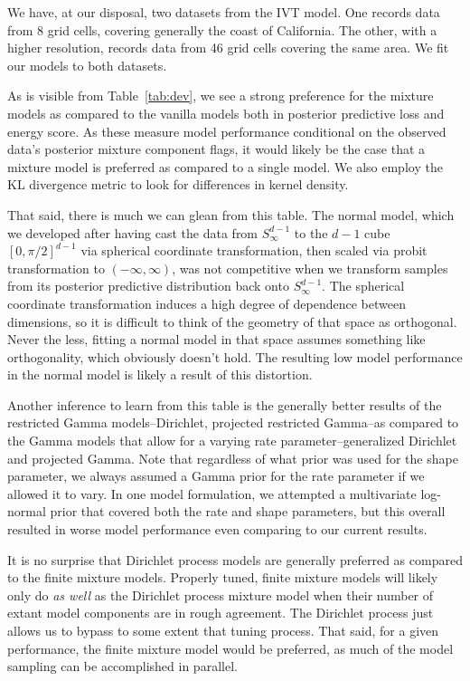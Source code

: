 We have, at our disposal, two datasets from the IVT model.  One records data from 8 grid cells,
  covering generally the coast of California.  The other, with a higher resolution, records data
  from 46 grid cells covering the same area.  We fit our models to both datasets.

\begin{table}[h]
  
\end{table}

As is visible from Table~\ref{tab:dev}, we see a strong preference for the mixture models as
  compared to the vanilla models both in posterior predictive loss and energy score.  As these
  measure model performance conditional on the observed data's posterior mixture component flags,
  it would likely be the case that a mixture model is preferred as compared to a single model.  We
  also employ the KL divergence metric to look for differences in kernel density.

That said, there is much we can glean from this table.  The normal model, which we developed after
  having cast the data from $S_{\infty}^{d-1}$ to the $d-1$ cube $[0,\pi/2]^{d-1}$ via spherical
  coordinate transformation, then scaled via probit transformation to $(-\infty,\infty)$, was not
  competitive when we transform samples from its posterior predictive distribution back onto
  $S_{\infty}^{d-1}$. The spherical coordinate transformation induces a high degree of dependence
  between dimensions, so it is difficult to think of the geometry of that space as orthogonal.
  Never the less, fitting a normal model in that space assumes something like orthogonality, which
  obviously doesn't hold.  The resulting low model performance in the normal model is likely a
  result of this distortion.

Another inference to learn from this table is the generally better results of the restricted Gamma
  models--Dirichlet, projected restricted Gamma--as compared to the Gamma models that allow for a
  varying rate parameter--generalized Dirichlet and projected Gamma.  Note that regardless of what
  prior was used for the shape parameter, we always assumed a Gamma prior for the rate parameter if
  we allowed it to vary.  In one model formulation, we attempted a multivariate log-normal prior that
  covered both the rate and shape parameters, but this overall resulted in worse model performance
  even comparing to our current results.

It is no surprise that Dirichlet process models are generally preferred as compared to the finite
  mixture models.  Properly tuned, finite mixture models will likely only do \emph{as well} as the
  Dirichlet process mixture model when their number of extant model components are in rough
  agreement.  The Dirichlet process just allows us to bypass to some extent that tuning process.
  That said, for a given performance, the finite mixture model would be preferred, as much of the
  model sampling can be accomplished in parallel.

